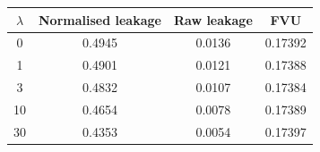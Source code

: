 \begin{tabular}{@{}cccc@{}}
\toprule
$\lambda$ & Normalised leakage & Raw leakage & FVU \\
\midrule
0 & 0.4945 & 0.0136 & 0.17392 \\
1 & 0.4901 & 0.0121 & 0.17388 \\
3 & 0.4832 & 0.0107 & 0.17384 \\
10 & 0.4654 & 0.0078 & 0.17389 \\
30 & 0.4353 & 0.0054 & 0.17397 \\
\bottomrule
\end{tabular}